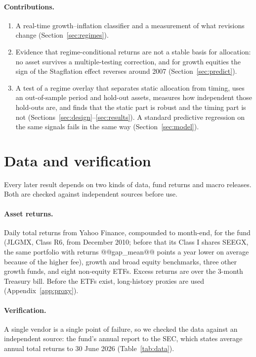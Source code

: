 \documentclass[11pt,a4paper]{article}
\begin{document}
\paragraph{Contributions.}
\begin{enumerate}
\item A real-time growth--inflation classifier and a measurement of what revisions change
(Section~\ref{sec:regimes}).
\item Evidence that regime-conditional returns are not a stable basis for allocation: no asset survives a
multiple-testing correction, and for growth equities the sign of the Stagflation effect reverses around 2007
(Section~\ref{sec:predict}).
\item A test of a regime overlay that separates static allocation from timing, uses an out-of-sample period
and hold-out assets, measures how independent those hold-outs are, and finds that the static part is robust and
the timing part is not (Sections~\ref{sec:design}--\ref{sec:results}). A standard predictive regression on the same
signals fails in the same way (Section~\ref{sec:model}).
\end{enumerate}

\section{Data and verification}
\label{sec:data}

Every later result depends on two kinds of data, fund returns and macro releases. Both are checked against independent sources before use.


\paragraph{Asset returns.} Daily total returns from Yahoo Finance, compounded to month-end, for the fund
(JLGMX, Class R6, from December 2010; before that its Class I shares SEEGX, the same portfolio with returns
@@gap_mean@@ points a year lower on average because of the higher fee), growth and broad equity benchmarks,
three other growth funds, and eight non-equity ETFs. Excess returns are over the 3-month Treasury bill. Before
the ETFs exist, long-history proxies are used (Appendix~\ref{app:proxy}).

\paragraph{Verification.} A single vendor is a single point of failure, so we checked the data against an
independent source: the fund's annual report to the SEC, which states average annual total returns to 30
June 2026 (Table~\ref{tab:data}).
\end{document}
